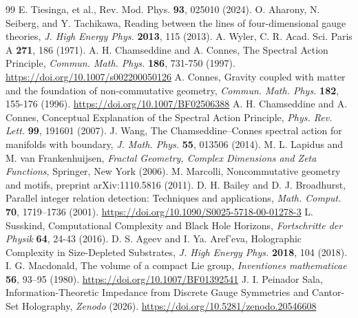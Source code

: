 \documentclass[12pt,a4paper]{article}
\begin{document}

\begin{thebibliography}{99}
 E. Tiesinga, et al., Rev. Mod. Phys. \textbf{93}, 025010 (2024).
 O. Aharony, N. Seiberg, and Y. Tachikawa, Reading between the lines of four-dimensional gauge theories, \textit{J. High Energy Phys.} \textbf{2013}, 115 (2013).
 A. Wyler, C. R. Acad. Sci. Paris A \textbf{271}, 186 (1971).
 A. H. Chamseddine and A. Connes, The Spectral Action Principle, \textit{Commun. Math. Phys.} \textbf{186}, 731-750 (1997). \url{https://doi.org/10.1007/s002200050126}
 A. Connes, Gravity coupled with matter and the foundation of non-commutative geometry, \textit{Commun. Math. Phys.} \textbf{182}, 155-176 (1996). \url{https://doi.org/10.1007/BF02506388}
 A. H. Chamseddine and A. Connes, Conceptual Explanation of the Spectral Action Principle, \textit{Phys. Rev. Lett.} \textbf{99}, 191601 (2007).
 J. Wang, The Chamseddine–Connes spectral action for manifolds with boundary, \textit{J. Math. Phys.} \textbf{55}, 013506 (2014).
 M. L. Lapidus and M. van Frankenhuijsen, \textit{Fractal Geometry, Complex Dimensions and Zeta Functions}, Springer, New York (2006).
 M. Marcolli, Noncommutative geometry and motifs, preprint arXiv:1110.5816 (2011).
 D. H. Bailey and D. J. Broadhurst, Parallel integer relation detection: Techniques and applications, \textit{Math. Comput.} \textbf{70}, 1719--1736 (2001). \url{https://doi.org/10.1090/S0025-5718-00-01278-3}
 L. Susskind, Computational Complexity and Black Hole Horizons, \textit{Fortschritte der Physik} \textbf{64}, 24-43 (2016).
 D. S. Ageev and I. Ya. Aref'eva, Holographic Complexity in Size-Depleted Substrates, \textit{J. High Energy Phys.} \textbf{2018}, 104 (2018).
 I. G. Macdonald, The volume of a compact Lie group, \textit{Inventiones mathematicae} \textbf{56}, 93–95 (1980). \url{https://doi.org/10.1007/BF01392541}
 J. I. Peinador Sala, Information-Theoretic Impedance from Discrete Gauge Symmetries and Cantor-Set Holography, \textit{Zenodo} (2026). \url{https://doi.org/10.5281/zenodo.20546608}
\end{thebibliography}
\end{document}

